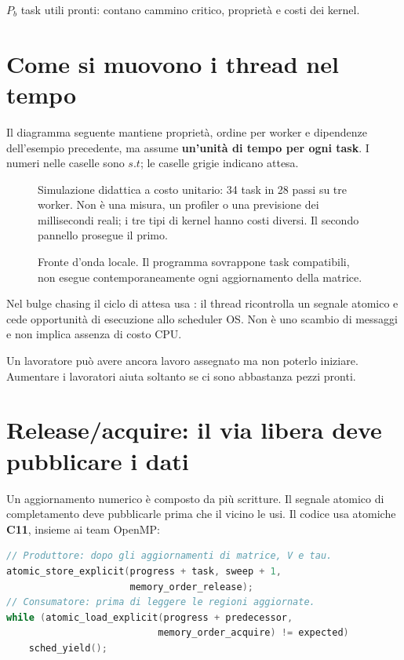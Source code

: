 \documentclass[11pt,a4paper]{article}
\newcommand{\semplice}[1]{\begin{idea}[title=In parole semplici]#1\end{idea}}
\newcommand{\cod}[1]{\texttt{\detokenize{#1}}}
\newcommand{\page}[1]{\clearpage\section{#1}}
\begin{document}
$P_b$ task utili pronti: contano cammino critico, proprietà e costi dei kernel.
\page{Come si muovono i thread nel tempo}
Il diagramma seguente mantiene proprietà, ordine per worker e dipendenze
dell'esempio precedente, ma assume \textbf{un'unità di tempo per ogni task}.
I numeri nelle caselle sono $s.t$; le caselle grigie indicano attesa.
\begin{figure}[H]\centering

\caption{Simulazione didattica a costo unitario: 34 task in 28 passi su tre
worker. Non è una misura, un profiler o una previsione dei millisecondi
reali; i tre tipi di kernel hanno costi diversi. Il secondo pannello prosegue il primo.}
\end{figure}
\begin{figure}[H]\centering
{}
\caption{Fronte d'onda locale. Il programma sovrappone task compatibili, non esegue contemporaneamente ogni aggiornamento della matrice.}
\end{figure}
Nel bulge chasing il ciclo di attesa usa \cod{sched_yield()}: il thread
ricontrolla un segnale atomico e cede opportunità di esecuzione allo scheduler
OS. Non è uno scambio di messaggi e non implica assenza di costo CPU.
\semplice{Un lavoratore può avere ancora lavoro assegnato ma non poterlo
iniziare. Aumentare i lavoratori aiuta soltanto se ci sono abbastanza pezzi pronti.}
\page{Release/acquire: il via libera deve pubblicare i dati}
Un aggiornamento numerico è composto da più scritture. Il segnale atomico
di completamento deve pubblicarle prima che il vicino le usi. Il codice
usa atomiche \textbf{C11}, insieme ai team OpenMP:
\begin{lstlisting}[language=C]
// Produttore: dopo gli aggiornamenti di matrice, V e tau.
atomic_store_explicit(progress + task, sweep + 1,
                      memory_order_release);
// Consumatore: prima di leggere le regioni aggiornate.
while (atomic_load_explicit(progress + predecessor,
                           memory_order_acquire) != expected)
    sched_yield();
\end{lstlisting}
\end{document}
